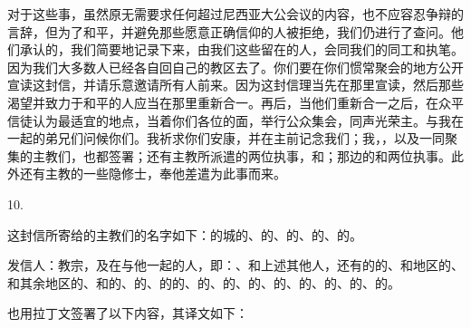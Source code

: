 对于这些事，虽然原无需要求任何超过尼西亚大公会议的内容，也不应容忍争辩的言辞，但为了和平，并避免那些愿意正确信仰的人被拒绝，我们仍进行了查问。他们承认的，我们简要地记录下来，由我们这些留在的人，会同我们的同工和执笔。因为我们大多数人已经各自回自己的教区去了。你们要在你们惯常聚会的地方公开宣读这封信，并请乐意邀请所有人前来。因为这封信理当先在那里宣读，然后那些渴望并致力于和平的人应当在那里重新合一。再后，当他们重新合一之后，在众平信徒认为最适宜的地点，当着你们各位的面，举行公众集会，同声光荣主。与我在一起的弟兄们问候你们。我祈求你们安康，并在主前记念我们；我，，以及一同聚集的主教们，也都签署；还有主教所派遣的两位执事，和；那边的和两位执事。此外还有主教的一些隐修士，奉他差遣为此事而来。\par

10. \par

这封信所寄给的主教们的名字如下：的城的、的、的、的、的。\par

发信人：教宗，及在与他一起的人，即：、和上述其他人，还有的的、和地区的、和其余地区的、和的、的、的的、的、的、的、的、的、的、的、的。\par

也用拉丁文签署了以下内容，其译文如下：\par

\par

